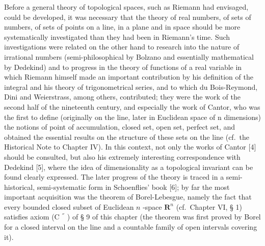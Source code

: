 Before a general theory of topological spaces, such as Riemann had envisaged, could be developed, it was necessary that the theory of real numbers, of sets of numbers, of sets of points on a line, in a plane and in space should be more systematically investigated than they had been in Riemann's time. Such investigations were related on the other hand to research into the nature of irrational numbers (semi-philosophical by Bolzano and essentially mathematical by Dedekind) and to progress in the theory of functions of a real variable in which Riemann himself made an important contribution by his definition of the integral and his theory of trigonometrical series, and to which du Bois-Reymond, Dini and Weierstrass, among others, contributed; they were the work of the second half of the nineteenth century, and especially the work of Cantor, who was the first to define (originally on the line, later in Euclidean space of n dimensions) the notions of point of accumulation, closed set, open set, perfect set, and obtained the essential results on the structure of these sets on the line (cf.~the Historical Note to Chapter IV). In this context, not only the works of Cantor {[}4{]} should be consulted, but also his extremely interesting correspondence with Dedekind {[}5{]}, where the idea of dimensionality as a topological invariant can be found clearly expressed. The later progress of the theory is traced in a semi-historical, semi-systematic form in Schoenflies' book {[}6{]}; by far the most important acquisition was the theorem of Borel-Lebesgue, namely the fact that every bounded closed subset of Euclidean \(n\) -space \(\mathbf{R}^n\) (cf.~Chapter VI, § 1) satisfies axiom (C \(^{''}\) ) of § 9 of this chapter (the theorem was first proved by Borel for a closed interval on the line and a countable family of open intervals covering it).

